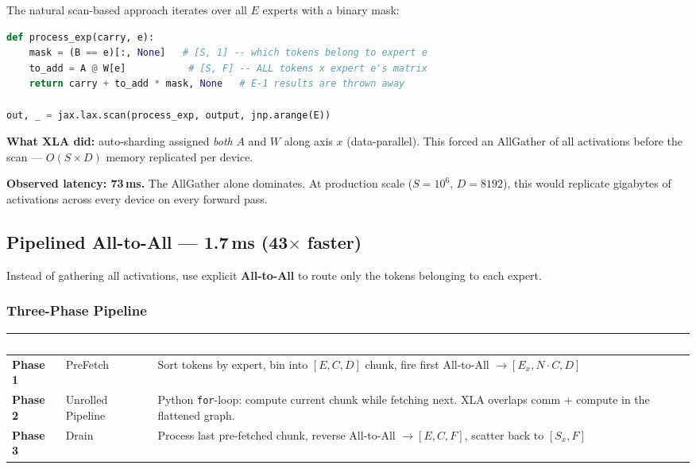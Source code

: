 \documentclass[11pt, a4paper]{article}
\newcommand{\thead}[1]{\textcolor{white}{\textbf{#1}}}
\newcommand{\roweven}{\rowcolor{rowlight}}
\begin{document}
The natural scan-based approach iterates over all $E$ experts with a binary mask:

\begin{lstlisting}[language=Python]
def process_exp(carry, e):
    mask = (B == e)[:, None]   # [S, 1] -- which tokens belong to expert e
    to_add = A @ W[e]           # [S, F] -- ALL tokens x expert e's matrix
    return carry + to_add * mask, None   # E-1 results are thrown away

out, _ = jax.lax.scan(process_exp, output, jnp.arange(E))
\end{lstlisting}

\textbf{What XLA did:} auto-sharding assigned \emph{both} $A$ and $W$ along axis $x$ (data-parallel). This forced an AllGather of all activations before the scan --- $O(S \times D)$ memory replicated per device.

\begin{calloutwarning}
\textbf{Observed latency: 73\,ms.} The AllGather alone dominates. At production scale ($S=10^6$, $D=8192$), this would replicate gigabytes of activations across every device on every forward pass.
\end{calloutwarning}

\subsection{Pipelined All-to-All --- 1.7\,ms \quad (43$\times$ faster)}

Instead of gathering all activations, use explicit \textbf{All-to-All} to route only the tokens belonging to each expert.

\subsubsection{Three-Phase Pipeline}

\begin{center}
\begin{tabularx}{\linewidth}{L{2.5cm} L{3cm} X}
  \toprule
  \thead{Phase} & \thead{Name} & \thead{Description} \\
  \midrule
  \roweven \textbf{Phase 1} & PreFetch & Sort tokens by expert, bin into $[E, C, D]$ chunk, fire first All-to-All $\to [E_x, N{\cdot}C, D]$ \\
  \textbf{Phase 2} & Unrolled Pipeline & Python \texttt{for}-loop: compute current chunk while fetching next. XLA overlaps comm + compute in the flattened graph. \\
  \roweven \textbf{Phase 3} & Drain & Process last pre-fetched chunk, reverse All-to-All $\to [E, C, F]$, scatter back to $[S_x, F]$ \\
  \bottomrule
\end{tabularx}
\end{center}
\end{document}
